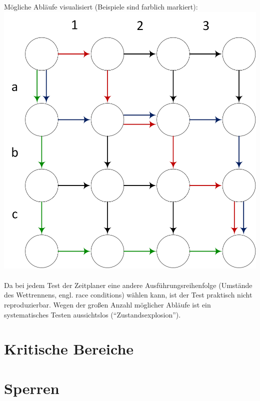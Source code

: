 Mögliche Abläufe visualisiert (Beispiele sind farblich markiert):\\
\includegraphics[width=.4\textwidth]{Nondeterminism}\\
\\
Da bei jedem Test der Zeitplaner eine andere Ausführungsreihenfolge (Umstände des Wettrennens, engl. race conditions) wählen kann, ist der Test praktisch nicht reproduzierbar. Wegen der großen Anzahl möglicher Abläufe ist ein systematisches Testen aussichtslos ("`Zustandsexplosion"').

\section{Kritische Bereiche}

\section{Sperren}